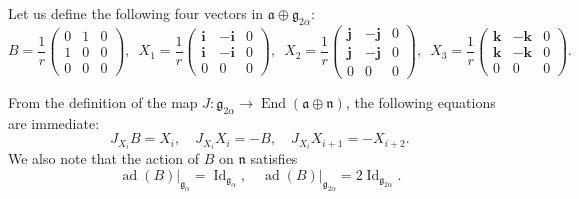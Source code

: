 \documentclass[12pt, a4paper,draft]{amsart}
\newcommand{\g}{\mathfrak}
\newcommand{\ad}{\operatorname{ad}}
\theoremstyle{remark}
\begin{document}
Let us define the following four vectors in $\g{a}\oplus\g{g}_{2\alpha}$:
\begin{equation*}
		B=\frac{1}{r}\left(
			\begin{array}{cc|c}
				0 & 1 & 0 \\
				1 & 0 & 0 \\
				\hline
				0 & 0 & 0
			\end{array}
		\right),\enspace
		X_{1}=\frac{1}{r}\left(
		\begin{array}{cc|c}
			\mathbf{i} & -\mathbf{i} & 0 \\
			\mathbf{i} & -\mathbf{i} & 0 \\
			\hline
			0 & 0 & 0
		\end{array}
		\right), \enspace
		X_{2}=\frac{1}{r}\left(
		\begin{array}{cc|c}
			\mathbf{j} & -\mathbf{j} & 0 \\
			\mathbf{j} & -\mathbf{j} & 0 \\
			\hline
			0 & 0 & 0
		\end{array}
		\right), \enspace
		X_{3}=\frac{1}{r}\left(
		\begin{array}{cc|c}
			\mathbf{k} & -\mathbf{k} & 0 \\
			\mathbf{k} & -\mathbf{k} & 0 \\
			\hline
			0 & 0 & 0
		\end{array}
		\right).
\end{equation*}

From the definition of the map $J\colon \g{g}_{2\alpha}\to\operatorname{End}(\g{a}\oplus\g{n})$, the following equations are immediate:
\begin{equation*}
	J_{X_{i}}B=X_{i}, \quad J_{X_{i}}X_{i}=-B,\quad J_{X_{i}}X_{i+1}=-X_{i+2}.
\end{equation*}
We also note that the action of $B$ on $\g{n}$ satisfies
\begin{equation*}
	\ad(B)\vert_{\g{g}_{\alpha}}=\operatorname{Id}_{\g{g}_{\alpha}}, \quad \ad(B)\vert_{\g{g}_{2\alpha}}=2\operatorname{Id}_{\g{g}_{2\alpha}}.
\end{equation*}
\end{document}
